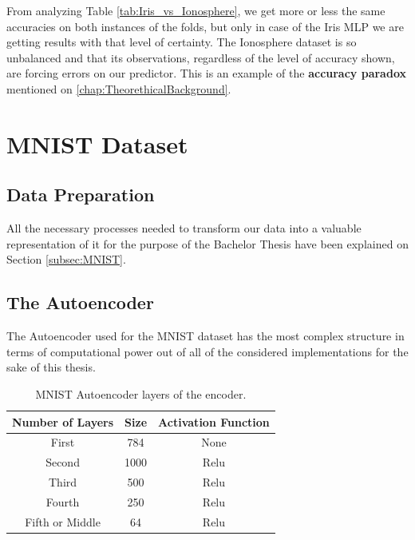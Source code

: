 From analyzing Table \ref{tab:Iris_vs_Ionosphere}, we get more or less the same accuracies on both instances of the folds, but only in case of the Iris MLP we are getting results with that level of certainty. The Ionosphere dataset is so unbalanced and that its observations, regardless of the level of accuracy shown, are forcing errors on our predictor. This is an example of the \textbf{accuracy paradox} mentioned on \autoref{chap:TheorethicalBackground}.

\section{MNIST Dataset}
\subsection{Data Preparation}

All the necessary processes needed to transform our data into a valuable representation of it for the purpose of the Bachelor Thesis have been explained on Section \ref{subsec:MNIST}.

\subsection{The Autoencoder}
The Autoencoder used for the MNIST dataset has the most complex structure in terms of computational power out of all of the considered implementations for the sake of this thesis. 

\begin{table}[H]
	\caption{MNIST Autoencoder layers of the encoder.}
	\begin{center}
		\label{tab:table_MNIST_auto_encoder}
		\begin{tabular}{c|c|c} %
			\textbf{Number of Layers} & \textbf{Size} & \textbf{Activation Function} \\
			\hline
			First & 784 & None\\
			Second & 1000 & Relu\\
			Third & 500  & Relu\\
			Fourth & 250 & Relu\\
			Fifth or Middle & 64 & Relu\\
		\end{tabular}
	\end{center}
\end{table}

